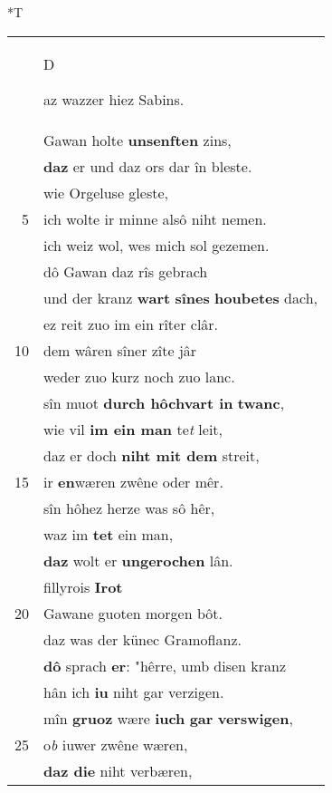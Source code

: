\documentclass[8pt,a4paper,notitlepage]{article}
\begin{document}
\begin{table}[ht]
\begin{minipage}[t]{0.5\linewidth}
\end{minipage}
\hspace{0.5cm}
\begin{minipage}[t]{0.5\linewidth}
\small
\begin{center}*T
\end{center}
\begin{tabular}{rl}
 & \begin{large}D\end{large}az wazzer hiez Sabins.\\ 
 & Gawan holte \textbf{unsenften} zins,\\ 
 & \textbf{daz} er und daz ors dar în bleste.\\ 
 & wie Orgeluse gleste,\\ 
5 & ich wolte ir minne alsô niht nemen.\\ 
 & ich weiz wol, wes mich sol gezemen.\\ 
 & dô Gawan daz rîs gebrach\\ 
 & und der kranz \textbf{wart} \textbf{sînes} \textbf{houbetes} dach,\\ 
 & ez reit zuo im ein rîter clâr.\\ 
10 & dem wâren sîner zîte jâr\\ 
 & weder zuo kurz noch zuo lanc.\\ 
 & sîn muot \textbf{durch hôchvart in} \textbf{twanc},\\ 
 & wie vil \textbf{im ein man} te\textit{t} leit,\\ 
 & daz er doch \textbf{niht mit dem} streit,\\ 
15 & ir \textbf{en}wæren zwêne oder mêr.\\ 
 & sîn hôhez herze was sô hêr,\\ 
 & waz im \textbf{tet} ein man,\\ 
 & \textbf{daz} wolt er \textbf{ungerochen} lân.\\ 
 & fillyrois \textbf{Irot}\\ 
20 & Gawane guoten morgen bôt.\\ 
 & daz was der künec Gramoflanz.\\ 
 & \textbf{dô} sprach \textbf{er}: "hêrre, umb disen kranz\\ 
 & hân ich \textbf{iu} niht gar verzigen.\\ 
 & mîn \textbf{gruoz} wære \textbf{iuch} \textbf{gar} \textbf{verswigen},\\ 
25 & o\textit{b} iuwer zwêne wæren,\\ 
 & \textbf{daz die} niht verbæren,\\ 

\end{tabular}
\end{minipage}
\end{table}
\end{document}
